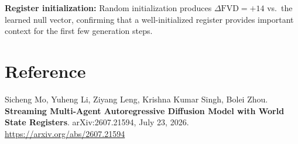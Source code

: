 \documentclass[10pt,twocolumn]{article}
\begin{document}
\textbf{Register initialization:} Random initialization produces
$\Delta\text{FVD} = +14$ vs.\ the learned null vector, confirming
that a well-initialized register provides important context for the
first few generation steps.

\section*{Reference}

Sicheng Mo, Yuheng Li, Ziyang Leng, Krishna Kumar Singh, Bolei Zhou.
\textbf{Streaming Multi-Agent Autoregressive Diffusion Model with
World State Registers}.
arXiv:2607.21594, July 23, 2026.
\url{https://arxiv.org/abs/2607.21594}
\end{document}
